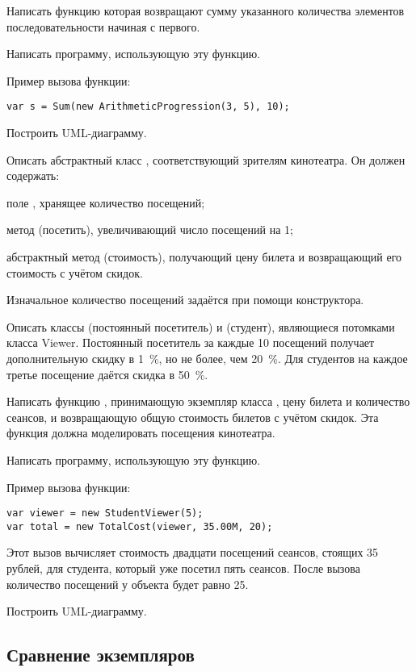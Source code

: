 Написать функцию  которая возвращают сумму указанного
количества элементов последовательности начиная с первого.

Написать программу, использующую эту функцию.

Пример вызова функции:
\begin{lstlisting}[numbers=none]
var s = Sum(new ArithmeticProgression(3, 5), 10);
\end{lstlisting}

Построить UML-диаграмму.

\task Описать абстрактный класс , соответствующий зрителям
кинотеатра. Он должен содержать:
\begin{itemize*}
\item поле , хранящее количество посещений;
\item метод  (посетить), увеличивающий число посещений на
  1;
\item абстрактный метод  (стоимость), получающий цену билета
  и возвращающий его стоимость с учётом скидок.
\end{itemize*}
Изначальное количество посещений задаётся при помощи конструктора.

Описать классы  (постоянный посетитель) и
 (студент), являющиеся потомками класса
Viewer. Постоянный посетитель за каждые 10 посещений получает
дополнительную скидку в 1~\%, но не более, чем 20~\%. Для студентов на
каждое третье посещение даётся скидка в 50~\%.

Написать функцию , принимающую экземпляр класса
, цену билета и количество сеансов, и возвращающую общую
стоимость билетов с учётом скидок. Эта функция должна моделировать
посещения кинотеатра.

Написать программу, использующую эту функцию.

Пример вызова функции:
\begin{lstlisting}[numbers=none]
var viewer = new StudentViewer(5);
var total = new TotalCost(viewer, 35.00M, 20);
\end{lstlisting}
Этот вызов вычисляет стоимость двадцати посещений сеансов, стоящих 35
рублей, для студента, который уже посетил пять сеансов. После вызова
количество посещений у объекта  будет равно 25.

Построить UML-диаграмму.


\subsection{Сравнение экземпляров}

